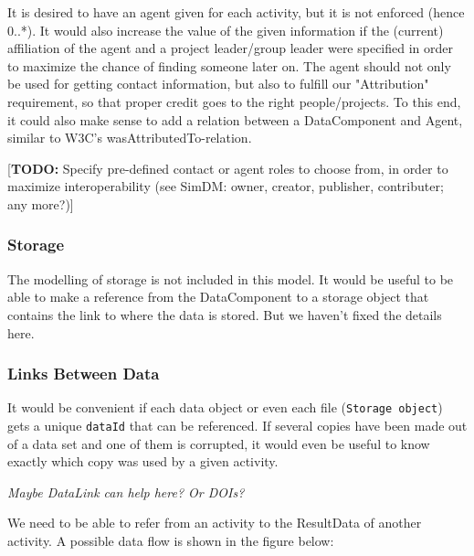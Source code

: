 \documentclass[11pt,a4paper]{ivoa}
\newcommand{\TODO}[1]{\noindent \textcolor{todocolor}{[\textbf{TODO:} #1]}}
\begin{document}
It is desired to have an agent given for each activity, but it
is not enforced (hence 0..*).  It would also increase the value of the given
information if the (current) affiliation of the agent and a project leader/group
leader were specified in order to maximize the chance of finding someone later
on. The agent should not only be used for getting contact information, but also 
to fulfill our "Attribution" requirement, so that proper credit goes to the right 
people/projects. To this end, it could also make sense to add a relation between a DataComponent and Agent, similar to W3C's wasAttributedTo-relation.


\TODO{Specify pre-defined contact or agent roles to choose from, in order to maximize interoperability (see SimDM: owner, creator, publisher, contributer; any more?)}


\subsubsection{Storage}
The modelling of storage is not included in this model. 
It would be useful to be able to make a reference from the DataComponent to a storage
object that contains the link to where the data is stored. But we haven't fixed the 
details here.


\subsubsection{Links Between Data}\label{sec:links_between_data}
It would be convenient if each data object or even each file (\texttt{Storage object})
gets a unique \texttt{dataId} that can be referenced. If several copies have been
made out of a data set and one of them is corrupted, it would even be useful to know
exactly which copy was used by a given activity. 

\emph{Maybe DataLink can help here? Or DOIs?}

We need to be able to refer from an activity to the ResultData of another
activity. A possible data flow is shown in the figure below:
\end{document}
